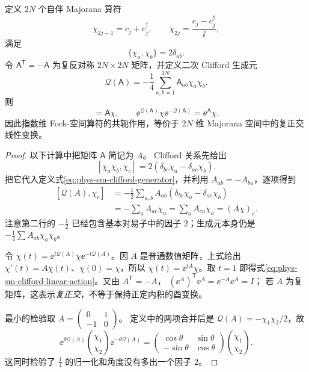 定义 \(2N\) 个自伴 Majorana 算符
\begin{equation}
 \chi_{2j-1}=c_j+c_j^\dagger,
 \qquad
 \chi_{2j}=\frac{c_j-c_j^\dagger}{\ii},
 \label{eq:phys-sm-majorana-definition}
\end{equation}
满足
\begin{equation}
 \{\chi_a,\chi_b\}=2\delta_{ab}.
 \label{eq:phys-sm-clifford-algebra}
\end{equation}
令 \(\mathsf A^{\mathsf T}=-\mathsf A\) 为复反对称 \(2N\times2N\) 矩阵，并定义二次 Clifford 生成元
\begin{equation}
 \mathcal Q(\mathsf A)
 =-\frac14\sum_{a,b=1}^{2N}
 \mathsf A_{ab}\chi_a\chi_b.
 \label{eq:phys-sm-clifford-generator}
\end{equation}
则
\begin{equation}
 [\mathcal Q(\mathsf A),\chi]
 =\mathsf A\chi,
 \qquad
 \ee^{\mathcal Q(\mathsf A)}\chi
 \ee^{-\mathcal Q(\mathsf A)}
 =\ee^{\mathsf A}\chi.
 \label{eq:phys-sm-clifford-linear-action}
\end{equation}
因此指数维 Fock-空间算符的共轭作用，等价于 \(2N\) 维 Majorana 空间中的复正交线性变换。

\begin{proof}
以下计算中把矩阵 $\mathsf A$ 简记为 $A$。
Clifford 关系先给出
\[
[\chi_a\chi_b,\chi_c]
=2(\delta_{bc}\chi_a-\delta_{ac}\chi_b).
\]
把它代入定义式\cref{eq:phys-sm-clifford-generator}，并利用 \(A_{ab}=-A_{ba}\)，逐项得到
\[
\begin{aligned}
[\mathcal Q(A),\chi_c]
&=-\frac12\sum_{a,b}A_{ab}
(\delta_{bc}\chi_a-\delta_{ac}\chi_b)\\
&=-\sum_aA_{ac}\chi_a
=\sum_aA_{ca}\chi_a=(A\chi)_c.
\end{aligned}
\]
注意第二行的 \(-\tfrac12\) 已经包含基本对易子中的因子 \(2\)；生成元本身仍是 \(-\tfrac14\sum A_{ab}\chi_a\chi_b\)。

令 \(\chi(t)=\ee^{t\mathcal Q(A)}\chi\ee^{-t\mathcal Q(A)}\)。因 \(A\) 是普通数值矩阵，上式给出
\(\chi'(t)=A\chi(t)\)、\(\chi(0)=\chi\)，所以
\(\chi(t)=\ee^{tA}\chi\)。取 \(t=1\) 即得式\cref{eq:phys-sm-clifford-linear-action}。又由 \(A^{\mathsf T}=-A\)，
\((\ee^A)^{\mathsf T}\ee^A=\ee^{-A}\ee^A=I\)；
若 \(A\) 为复矩阵，这表示\emph{复正交}，不等于保持正定内积的酉变换。

最小的检验取 \(A=\left(\begin{smallmatrix}0&1\\-1&0\end{smallmatrix}\right)\)。
定义中的两项合并后是
\(\mathcal Q(A)=-\chi_1\chi_2/2\)，故
\[
\ee^{\theta\mathcal Q(A)}
\binom{\chi_1}{\chi_2}
\ee^{-\theta\mathcal Q(A)}
=
\begin{pmatrix}\cos\theta&\sin\theta\\
-\sin\theta&\cos\theta\end{pmatrix}
\binom{\chi_1}{\chi_2}.
\]
这同时检验了 \(\tfrac14\) 的归一化和角度没有多出一个因子 \(2\)。
\end{proof}

